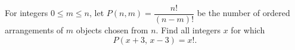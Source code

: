 For integers $0\le m\le n$, let $P(n,m)=\dfrac{n!}{(n-m)!}$ be the number of ordered arrangements of $m$ objects chosen from $n$. Find all integers $x$ for which
\[P(x+3,\,x-3)=x!.\]
